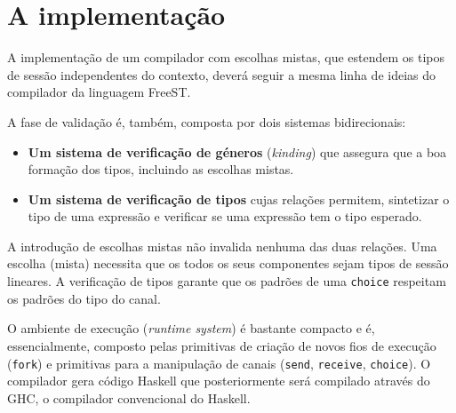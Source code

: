 \section{A implementação}

A implementação de um compilador com escolhas mistas, que estendem os tipos de sessão
independentes do contexto, deverá seguir a mesma linha de ideias do compilador da linguagem FreeST\cite{2019freest,2019freest-inforum}.

A fase de validação é, também, composta por dois sistemas bidirecionais:
\begin{itemize}
\item \textbf{Um sistema de verificação de géneros} (\textit{kinding}) que assegura que a boa formação dos tipos, incluindo as escolhas mistas.
\item \textbf{Um sistema de verificação de tipos} cujas relações permitem, sintetizar o tipo de uma expressão e verificar se uma expressão tem o tipo esperado. 
\end{itemize}
A introdução de escolhas mistas não invalida nenhuma das duas relações.
Uma escolha (mista) necessita que os todos os seus componentes sejam tipos de sessão lineares. A verificação de tipos garante que os padrões de uma \lstinline|choice| respeitam os padrões do tipo do canal.

O ambiente de execução (\textit{runtime system}) é bastante compacto e é, essencialmente, composto pelas primitivas de criação de novos fios de execução (\lstinline|fork|) e primitivas para a manipulação de canais (\lstinline|send|, \lstinline|receive|, \lstinline|choice|). O compilador gera código Haskell que posteriormente será compilado através do GHC, o compilador convencional do Haskell.

